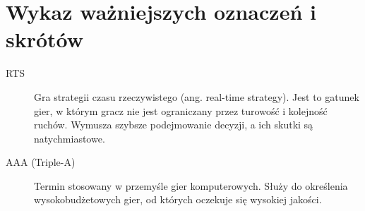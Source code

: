\chapter*{Wykaz ważniejszych oznaczeń i skrótów}
\begin{description}
\item[RTS] Gra strategii czasu rzeczywistego (ang. real-time strategy). Jest to gatunek gier, w którym gracz nie jest
ograniczany przez turowość i kolejność ruchów. Wymusza szybsze podejmowanie decyzji, a ich skutki są natychmiastowe.
\item[AAA (Triple-A)] Termin stosowany w przemyśle gier komputerowych. Służy do określenia wysokobudżetowych gier, od
których oczekuje się wysokiej jakości.
\end{description}
